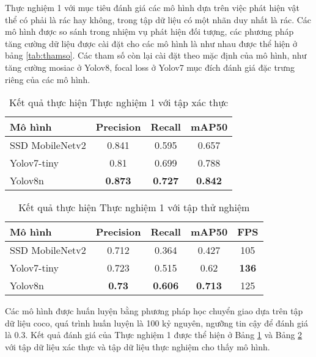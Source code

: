 \documentclass[../the.tex]{subfiles}
\begin{document}
{\fontsize{13}{12} \selectfont
Thực nghiệm 1 với mục tiêu đánh giá các mô hình dựa trên việc phát hiện vật thể có phải là rác hay không, trong tập dữ liệu có một nhãn duy nhất là rác.
Các mô hình được so sánh trong nhiệm vụ phát hiện đối tượng, các phương pháp tăng cường dữ liệu được cài đặt cho các mô hình là như nhau được thể hiện ở bảng \ref{tab:thamso}.
Các tham số còn lại cài đặt theo mặc định của mô hình, như tăng cường mosiac ở Yolov8, focal loss ở Yolov7 mục đích đánh giá đặc trưng riêng của các mô hình.

}
\begin{table}[h!]
    \centering
    \caption{Kết quả thực hiện Thực nghiệm 1 với tập xác thực}
    \begin{tabular}{|l|c|c|c|}
        \hline
        \textbf{Mô hình}  & \textbf{Precision} & \textbf{Recall} & \textbf{mAP50} \\ \hline
        SSD   MobileNetv2 & 0.841              & 0.595           & 0.657          \\ \hline
        Yolov7-tiny       & 0.81               & 0.699           & 0.788          \\ \hline
        Yolov8n           & \textbf{0.873}     & \textbf{0.727}  & \textbf{0.842} \\ \hline
    \end{tabular}
    \label{tab:thucnghiem1.1}
\end{table}

\begin{table}[h!]
    \centering
    \caption{Kết quả thực hiện Thực nghiệm 1 với tập thử nghiệm}
    \begin{tabular}{|l|c|c|c|c|}
        \hline
        \textbf{Mô hình} & \textbf{Precision} & \textbf{Recall} & \textbf{mAP50} & \multicolumn{1}{l|}{\textbf{FPS}} \\ \hline
        SSD MobileNetv2  & 0.712              & 0.364           & 0.427          & 105                               \\ \hline
        Yolov7-tiny      & 0.723              & 0.515           & 0.62           & \textbf{136}                      \\ \hline
        Yolov8n          & \textbf{0.73}      & \textbf{0.606}  & \textbf{0.713} & 125                               \\ \hline
    \end{tabular}
    \label{tab:thucnghiem1.2}
\end{table}

{\fontsize{13}{12} \selectfont
Các mô hình được huấn luyện bằng phương pháp học chuyển giao dựa trên tập dữ liệu coco, quá trình huấn luyện là 100 kỷ nguyên, ngưỡng tin cậy để đánh giá là 0.3.
Kết quả đánh giá của Thực nghiệm 1 được thể hiện ở Bảng \ref{tab:thucnghiem1.1}
và Bảng \ref{tab:thucnghiem1.2} với tập dữ liệu xác thực và tập dữ liệu thực nghiệm cho thấy mô hình.
}
\end{document}
